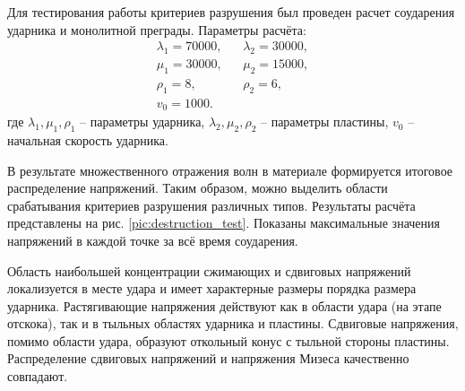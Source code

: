 Для тестирования работы критериев разрушения был проведен расчет соударения ударника и монолитной преграды. Параметры расчёта:
\begin{align}
\lambda_1=70000, & & \lambda_2=30000, \nonumber\\
\mu_1=30000, & & \mu_2=15000, \nonumber\\
\rho_1=8, & & \rho_2=6, \nonumber\\
v_0 = 1000.
\end{align}
где $\lambda_1, \mu_1, \rho_1$ -- параметры ударника, $\lambda_2, \mu_2, \rho_2$ -- параметры пластины, $v_0$ -- начальная скорость ударника.

В результате множественного отражения волн в материале формируется итоговое распределение напряжений. Таким образом, можно выделить области срабатывания критериев разрушения различных типов. Результаты расчёта представлены на рис. \ref{pic:destruction_test}. Показаны максимальные значения напряжений в каждой точке за всё время соударения.

Область наибольшей концентрации сжимающих и сдвиговых напряжений локализуется в месте удара и имеет характерные размеры порядка размера ударника. Растягивающие напряжения действуют как в области удара (на этапе отскока), так и в тыльных областях ударника и пластины. Сдвиговые напряжения, помимо области удара, образуют откольный конус с тыльной стороны пластины. Распределение сдвиговых напряжений и напряжения Мизеса качественно совпадают.

